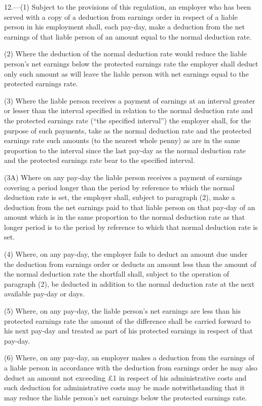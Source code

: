 \documentclass[12pt,a4paper]{article}
\begin{document}
12.—(1) Subject to the provisions of this regulation, an employer who has been served with a copy of a deduction from earnings order in respect of a liable person in his employment shall, each pay-day, make a deduction from the net earnings of that liable person of an amount equal to the normal deduction rate.

(2) Where the deduction of the normal deduction rate would reduce the liable person’s net earnings below the protected earnings rate the employer shall deduct only such amount as will leave the liable person with net earnings equal to the protected earnings rate.

(3) Where the liable person receives a payment of earnings at an interval greater or lesser than the interval specified in relation to the normal deduction rate and the protected earnings rate (“the specified interval”) the employer shall, for the purpose of such payments, take as the normal deduction rate and the protected earnings rate such amounts (to the nearest whole penny) as are in the same proportion to the interval since the last pay-day as the normal deduction rate and the protected earnings rate bear to the specified interval.

(3A) Where on any pay-day the liable person receives a payment of earnings covering a period longer than the period by reference to which the normal deduction rate is set, the employer shall, subject to paragraph (2), make a deduction from the net earnings paid to that liable person on that pay-day of an amount which is in the same proportion to the normal deduction rate as that longer period is to the period by reference to which that normal deduction rate is set.

(4) Where, on any pay-day, the employer fails to deduct an amount due under the deduction from earnings order or deducts an amount less than the amount of the normal deduction rate the shortfall shall, subject to the operation of paragraph (2), be deducted in addition to the normal deduction rate at the next available pay-day or days.

(5) Where, on any pay-day, the liable person’s net earnings are less than his protected earnings rate the amount of the difference shall be carried forward to his next pay-day and treated as part of his protected earnings in respect of that pay-day.

(6) Where, on any pay-day, an employer makes a deduction from the earnings of a liable person in accordance with the deduction from earnings order he may also deduct an amount not exceeding £1 in respect of his administrative costs and such deduction for administrative costs may be made notwithstanding that it may reduce the liable person’s net earnings below the protected earnings rate.
\end{document}
